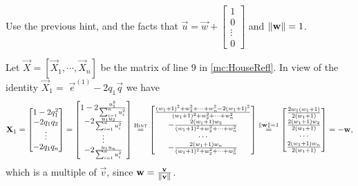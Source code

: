 \begin{problem}
\begin{subproblem}[4]
 \begin{hint}
 Use the previous hint, and the facts that $\vec{u} = \vec{w} + \begin{bmatrix} 1 \\ 0 \\ \vdots \\ 0 \end{bmatrix}$ and $\left\lVert \mathbf{w} \right\rVert = 1$.
 \end{hint}
 
 \begin{solution}
  Let $\vec{X} = [\vec{X}_1, \cdots, \vec{X}_n]$ be the matrix of line 9 in \autoref{mc:HouseRefl}. In view of the identity $ \vec{X}_1 = \;  \vec{e}^{(1)} - 2 q_1 \vec{q} $ we have
\[
   \mathbf{X}_1 
   =  \begin{bmatrix} 1 -2q_1^2 \\ -2q_1q_2 \\ \vdots \\ -2q_1q_n \end{bmatrix} 
   =  \begin{bmatrix} 1 - 2 \frac{u_1^2}{\sum_{i = 1}^n u_i^2} \\ - 2 \frac{u_1 u_2}{\sum_{i = 1}^n u_i^2} \\ \vdots \\ - 2 \frac{u_1 u_n}{\sum_{i = 1}^n u_i^2} \end{bmatrix} 
 \overset{\textsc{Hint}}{=}  \begin{bmatrix}
      \frac{(w_1+1)^2 + w_2^2 + \cdots + w_n^2 - 2(w_1+1)^2}{(w_1+1)^2 + w_2^2 + \cdots + w_n^2} \\
      - \frac{2(w_1+1)w_2}{(w_1+1)^2 + w_2^2 + \cdots + w_n^2} \\
      \cdots \\
      - \frac{2(w_1+1)w_n}{(w_1+1)^2 + w_2^2 + \cdots + w_n^2}
   \end{bmatrix} 
    \overset{\left\lVert \mathbf{w} \right\rVert = 1}{=}  \begin{bmatrix} 
      \frac{2w_1(w_1+1)}{2(w_1+1)} \\
      \frac{2(w_1+1)w_2}{2(w_1+1)} \\
      \cdots \\
      \frac{2(w_1+1)w_n}{2(w_1+1)} \\
    \end{bmatrix} 
   =  - \mathbf{w},
  \]
  which is a multiple of $\vec{v}$, since $  \mathbf{w} =  \frac{\mathbf{v}}{\left\lVert \mathbf{v} \right\rVert}$.
 \end{solution}
\end{subproblem}



\end{problem}

